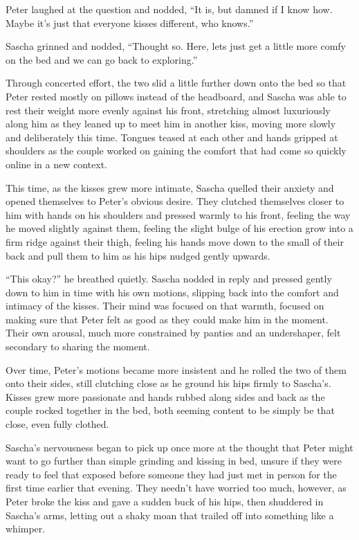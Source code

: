 \documentclass[12pt,letterpaper,oneside]{memoir}
\begin{document}
  Peter laughed at the question and nodded, ``It is, but damned if I know how. Maybe it's just that everyone kisses different, who knows.''

  Sascha grinned and nodded, ``Thought so. Here, lets just get a little more comfy on the bed and we can go back to exploring.''

  Through concerted effort, the two slid a little further down onto the bed so that Peter rested mostly on pillows instead of the headboard, and Sascha was able to rest their weight more evenly against his front, stretching almost luxuriously along him as they leaned up to meet him in another kiss, moving more slowly and deliberately this time. Tongues teased at each other and hands gripped at shoulders as the couple worked on gaining the comfort that had come so quickly online in a new context.

  This time, as the kisses grew more intimate, Sascha quelled their anxiety and opened themselves to Peter's obvious desire. They clutched themselves closer to him with hands on his shoulders and pressed warmly to his front, feeling the way he moved slightly against them, feeling the slight bulge of his erection grow into a firm ridge against their thigh, feeling his hands move down to the small of their back and pull them to him as his hips nudged gently upwards.

  ``This okay?'' he breathed quietly. Sascha nodded in reply and pressed gently down to him in time with his own motions, slipping back into the comfort and intimacy of the kisses. Their mind was focused on that warmth, focused on making sure that Peter felt as good as they could make him in the moment. Their own arousal, much more constrained by panties and an undershaper, felt secondary to sharing the moment.

  Over time, Peter's motions became more insistent and he rolled the two of them onto their sides, still clutching close as he ground his hips firmly to Sascha's. Kisses grew more passionate and hands rubbed along sides and back as the couple rocked together in the bed, both seeming content to be simply be that close, even fully clothed.

  Sascha's nervousness began to pick up once more at the thought that Peter might want to go further than simple grinding and kissing in bed, unsure if they were ready to feel that exposed before someone they had just met in person for the first time earlier that evening. They needn't have worried too much, however, as Peter broke the kiss and gave a sudden buck of his hips, then shuddered in Sascha's arms, letting out a shaky moan that trailed off into something like a whimper.
\end{document}

